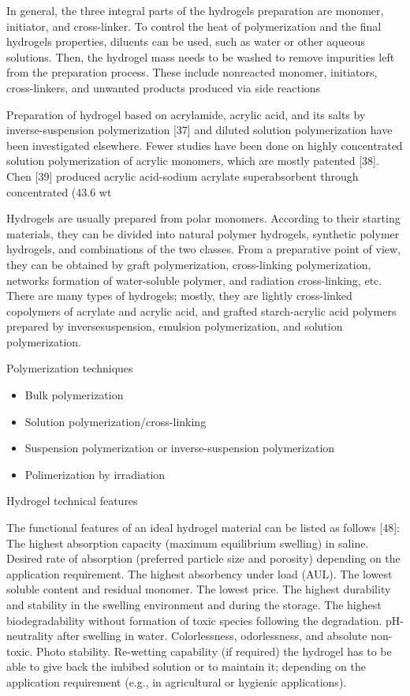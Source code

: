 \documentclass[../../main-notes.tex]{subfiles}
\begin{document}
In general, the three integral parts of the hydrogels preparation are monomer, initiator, and cross-linker. 
To control the heat of polymerization and the final hydrogels properties, diluents can be used, such as water or other aqueous solutions. 
Then, the hydrogel mass needs to be washed to remove impurities left from the preparation process. 
These include nonreacted monomer, initiators, cross-linkers, and unwanted products produced via side reactions

Preparation of hydrogel based on acrylamide, acrylic acid, and its salts by inverse-suspension polymerization [37] and diluted solution polymerization have been investigated elsewhere. 
Fewer studies have been done on highly concentrated solution polymerization of acrylic monomers, which are mostly patented [38]. 
Chen [39] produced acrylic acid-sodium acrylate superabsorbent through concentrated (43.6 wt%

Hydrogels are usually prepared from polar monomers. 
According to their starting materials, they can be divided into natural polymer hydrogels, synthetic polymer hydrogels, and combinations of the two classes. 
From a preparative point of view, they can be obtained by graft polymerization, cross-linking polymerization, networks formation of water-soluble polymer, and radiation cross-linking, etc. 
There are many types of hydrogels; mostly, they are lightly cross-linked copolymers of acrylate and acrylic acid, and grafted starch-acrylic acid polymers prepared by inversesuspension, emulsion polymerization, and solution polymerization. 


Polymerization techniques

\begin{itemize}
    \item Bulk polymerization
    \item Solution polymerization/cross-linking
    \item Suspension polymerization or inverse-suspension polymerization 
    \item Polimerization by irradiation 
\end{itemize}


Hydrogel technical features  

The functional features of an ideal hydrogel material can be listed as follows [48]:  
The highest absorption capacity (maximum equilibrium swelling) in saline. 
Desired rate of absorption (preferred particle size and porosity) depending on the application requirement. 
The highest absorbency under load (AUL). 
The lowest soluble content and residual monomer. 
The lowest price. 
The highest durability and stability in the swelling environment and during the storage. 
The highest biodegradability without formation of toxic species following the degradation. pH-neutrality after swelling in water. 
Colorlessness, odorlessness, and absolute non-toxic. 
Photo stability. 
Re-wetting capability (if required) the hydrogel has to be able to give back the imbibed solution or to maintain it; depending on the application requirement (e.g., in agricultural or hygienic applications).  
\end{document}
